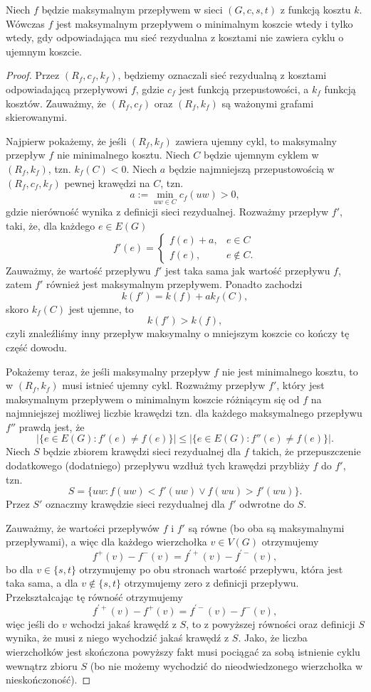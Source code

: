 \begin{theorem}
	 Niech $f$ będzie
	maksymalnym przepływem w sieci $(G, c, s, t)$ z funkcją 
	kosztu $k$. Wówczas $f$ jest maksymalnym przepływem 
	o minimalnym koszcie wtedy i tylko wtedy, gdy 
	odpowiadająca mu sieć rezydualna z kosztami
	nie zawiera cyklu o ujemnym koszcie.
	\begin{proof}
		Przez $(R_f, c_f, k_f)$, będziemy oznaczali sieć rezydualną
		z kosztami odpowiadającą przepływowi $f$, gdzie $c_f$ 
		jest funkcją przepustowości, a $k_f$ funkcją kosztów.
		Zauważmy, że $(R_f, c_f)$ oraz $(R_f, k_f)$ są ważonymi 
		grafami skierowanymi.
		
		Najpierw pokażemy, że jeśli $(R_f, k_f)$ zawiera ujemny cykl,
		to maksymalny przepływ $f$ nie minimalnego kosztu.
		Niech $C$ będzie ujemnym cyklem w $(R_f, k_f)$, tzn. $k_f(C) < 0$.
		Niech $a$ będzie najmniejszą przepustowością w $(R_f, c_f, k_f)$ pewnej
		krawędzi na $C$, tzn.
		\[a := \min_{uw \in C} c_f(uw) > 0,\]
		gdzie nierówność wynika z definicji sieci rezydualnej. Rozważmy 
		przepływ $f'$, taki, że, dla każdego
		$e \in E(G)$
		\[f'(e) = \begin{cases} 
			f(e) + a, &  e \in C \\
			f(e), & e \notin C.
		\end{cases}\]
		Zauważmy, że wartość przepływu $f'$ jest taka sama
		jak wartość przepływu $f$, zatem $f'$ również jest
		maksymalnym przepływem. Ponadto zachodzi 
		\[k(f') = k(f) + ak_f(C),\]
		skoro $k_f(C)$ jest ujemne, to 
		\[k(f') > k(f),\]
		czyli znaleźliśmy inny przepływ maksymalny o mniejszym koszcie
		co kończy tę część dowodu.
		
		Pokażemy teraz, że jeśli maksymalny przepływ $f$
		nie jest minimalnego kosztu, to w $(R_f, k_f)$ musi istnieć
		ujemny cykl. Rozważmy przepływ $f'$, który jest
		maksymalnym przepływem o minimalnym koszcie różniącym
		się od $f$ na najmniejszej możliwej liczbie krawędzi tzn.
		dla każdego maksymalnego przepływu $f''$ prawdą jest, że
		\[|\{e \in E(G) : f'(e) \not = f(e)\}| \leq 
		|\{e \in E(G) : f''(e) \not = f(e)\}|.\]
		Niech $S$ będzie zbiorem krawędzi sieci rezydualnej dla $f$ 
		takich, że przepuszczenie dodatkowego (dodatniego)
		przepływu wzdłuż tych krawędzi przybliży $f$ do $f'$, tzn.
		\[S = \{uw : f(uw) < f'(uw) \lor f(wu) > f'(wu)\}.\]
		Przez $S'$ oznaczmy krawędzie sieci rezydualnej dla $f'$
		odwrotne do $S$.
		
		Zauważmy, że wartości przepływów $f$ i $f'$ są równe (bo oba są
		maksymalnymi przepływami), a więc dla każdego wierzchołka
		$v \in V(G)$ otrzymujemy
		\[f^+(v) - f^-(v) = f^{'+}(v) - f^{'-}(v),\]
		bo dla $v \in \{s, t\}$ otrzymujemy po obu 
		stronach wartość przepływu, która jest taka sama, a
		dla  $v \not \in \{s, t\}$ otrzymujemy zero z definicji przepływu.
		Przekształcając tę równość otrzymujemy
		\[f^{'+}(v) - f^+(v) = f^{'-}(v) - f^{-}(v),\]
		więc jeśli do $v$ wchodzi jakaś krawędź z $S$, to 
		z powyższej równości oraz definicji $S$ wynika, że
		musi z niego wychodzić jakaś krawędź z $S$. Jako, że
		liczba wierzchołków jest skończona powyższy fakt musi 
		pociągać za sobą istnienie cyklu wewnątrz zbioru $S$ (bo
		nie możemy wychodzić
		do nieodwiedzonego wierzchołka w nieskończoność).
		

\end{proof}
\end{theorem}
